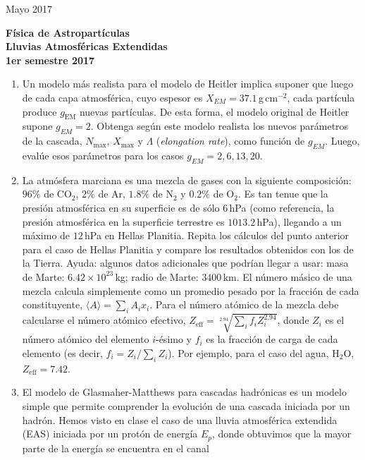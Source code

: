 \documentclass[11pt]{article}
\begin{document}
\pagestyle{empty}
{Mayo 2017}
\begin{center}
	{\Large \bf Física de Astropartículas} \\
{ \large \bf Lluvias Atmosféricas Extendidas} \\ {\bf 1er semestre 2017}
\end{center}

\setcounter{enumi}{0}      %
\begin{enumerate}
	\item Un modelo más realista para el modelo de Heitler implica suponer que
		luego de cada capa atmosférica, cuyo espesor es
		$X_{EM}=37.1$\,g\,cm$^{-2}$, cada partícula produce $g_{\mathrm{EM}}$
		nuevas partículas. De esta forma, el modelo original de Heitler supone
		$g_{EM}=2$. Obtenga según este modelo realista los nuevos parámetros de
		la cascada, $N_{\max}$, $X_{\max}$ y $\Lambda$ ({\it{elongation
		rate}}), como función de $g_{EM}$. Luego, evalúe esos parámetros para
		los casos $g_{EM}=2, 6, 13, 20$.
	\item La atmósfera marciana es una mezcla de gases con la siguiente
		composición: $96\%$ de CO$_2$, $2\%$ de Ar, $1.8\%$ de N$_2$ y $0.2\%$
		de O$_2$. Es tan tenue que la presión atmosférica en su superficie es
		de sólo $6$\,hPa (como referencia, la presión atmosférica en la
		superficie terrestre es $1013.2$\,hPa), llegando a un máximo de
		$12$\,hPa en Hellas Planitia. Repita los cálculos del punto anterior
		para el caso de Hellas Planitia y compare los resultados obtenidos con
		los de la Tierra. Ayuda: algunos datos adicionales que podrían llegar a
		usar: masa de Marte: $6.42\times10^{23}$\,kg; radio de Marte:
		$3400$\,km. El número másico de una mezcla calcula simplemente como un
		promedio pesado por la fracción de cada constituyente, $\langle A
		\rangle = \sum_i A_i x_i$. Para el número atómico de la mezcla debe
		calcularse el número atómico efectivo,
		$Z_{\mathrm{eff}}=\sqrt[2.94]{\sum_i f_i Z_i^{2.94}}$, donde $Z_i$ es
		el número atómico del elemento $i$-ésimo y $f_i$ es la fracción de
		carga de cada elemento (es decir, $f_i=Z_i/\sum_i Z_i$). Por ejemplo,
		para el caso del agua, H$_2$O, $Z_{\mathrm{eff}}=7.42$.
	\item El modelo de Glasmaher-Matthews para cascadas hadrónicas es un modelo
		simple que permite comprender la evolución de una cascada iniciada por
		un hadrón. Hemos visto en clase el caso de una lluvia atmosférica
		extendida (EAS) iniciada por un protón de energía $E_p$, donde
		obtuvimos que la mayor parte de la energía se encuentra en el canal

\end{enumerate}
\end{document}
